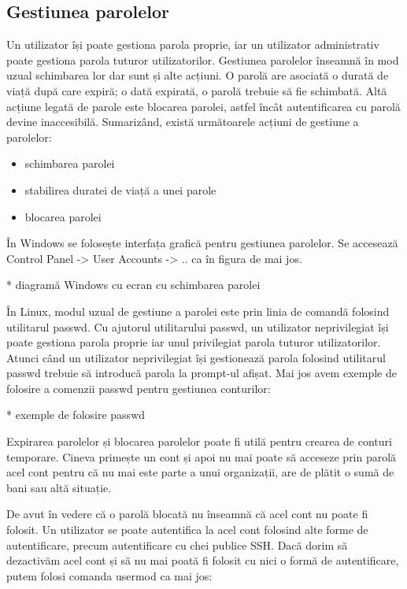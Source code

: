 \subsection{Gestiunea parolelor}
\label{sec:users-auth-pass-gestiune}

Un utilizator își poate gestiona parola proprie, iar un utilizator administrativ
poate gestiona parola tuturor utilizatorilor. Gestiunea parolelor înseamnă în
mod uzual schimbarea lor dar sunt și alte acțiuni. O parolă are asociată o
durată de viață după care expiră; o dată expirată, o parolă trebuie să fie
schimbată. Altă acțiune legată de parole este blocarea parolei, astfel încât
autentificarea cu parolă devine inaccesibilă. Sumarizând, există următoarele
acțiuni de gestiune a parolelor:

\begin{itemize}
	\item schimbarea parolei
	\item stabilirea duratei de viață a unei parole
	\item blocarea parolei
\end{itemize}

În Windows se folosește interfața grafică pentru gestiunea parolelor. Se
accesează Control Panel -> User Accounts -> .. ca în figura de mai jos.

* diagramă Windows cu ecran cu schimbarea parolei

În Linux, modul uzual de gestiune a parolei este prin linia de comandă folosind
utilitarul passwd. Cu ajutorul utilitarului passwd, un utilizator neprivilegiat
își poate gestiona parola proprie iar unul privilegiat parola tuturor
utilizatorilor. Atunci când un utilizator neprivilegiat își gestionează parola
folosind utilitarul passwd trebuie să introducă parola la prompt-ul afișat. Mai
jos avem exemple de folosire a comenzii passwd pentru gestiunea conturilor:

* exemple de folosire passwd

Expirarea parolelor și blocarea parolelor poate fi utilă pentru crearea de
conturi temporare. Cineva primește un cont și apoi nu mai poate să acceseze prin
parolă acel cont pentru că nu mai este parte a unui organizații, are de plătit o
sumă de bani sau altă situație.

De avut în vedere că o parolă blocată nu înseamnă că acel cont nu poate fi
folosit. Un utilizator se poate autentifica la acel cont folosind alte forme de
autentificare, precum autentificare cu chei publice SSH. Dacă dorim să
dezactivăm acel cont și să nu mai poată fi folosit cu nici o formă de
autentificare, putem folosi comanda usermod ca mai jos:

